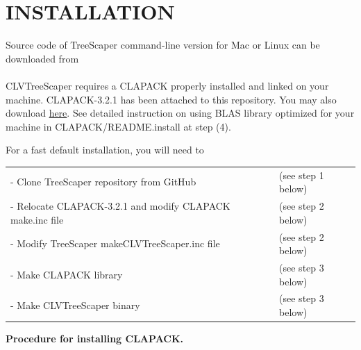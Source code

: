\documentclass[11pt]{article}
\begin{document}
\newpage

\section{INSTALLATION}\label{sect:Installation}

Source code of TreeScaper command-line version for Mac or Linux can be downloaded from \\

 \\



CLVTreeScaper requires a CLAPACK properly installed and linked on your machine. 
	CLAPACK-3.2.1 has been attached to this repository. You may also download \href{https://www.netlib.org/clapack/}{here}. See detailed instruction on using BLAS library optimized for your machine in 
	CLAPACK/README.install at step (4).
	
	
	
	For a fast default installation, you will need to
	\begin{table}[!h]
		\begin{tabular}{ll}
			- Clone TreeScaper repository from GitHub                   &(see step 1 below)\\
			- Relocate CLAPACK-3.2.1 and modify CLAPACK make.inc file   &(see step 2 below)\\
			- Modify TreeScaper makeCLVTreeScaper.inc file              &(see step 2 below)\\
			- Make CLAPACK library                                      &(see step 3 below)\\
			- Make CLVTreeScaper binary                                 &(see step 3 below)\\
		\end{tabular}
	\end{table}
	
	
	
	\textbf{Procedure for installing CLAPACK.}
	
	
	
\end{document}
